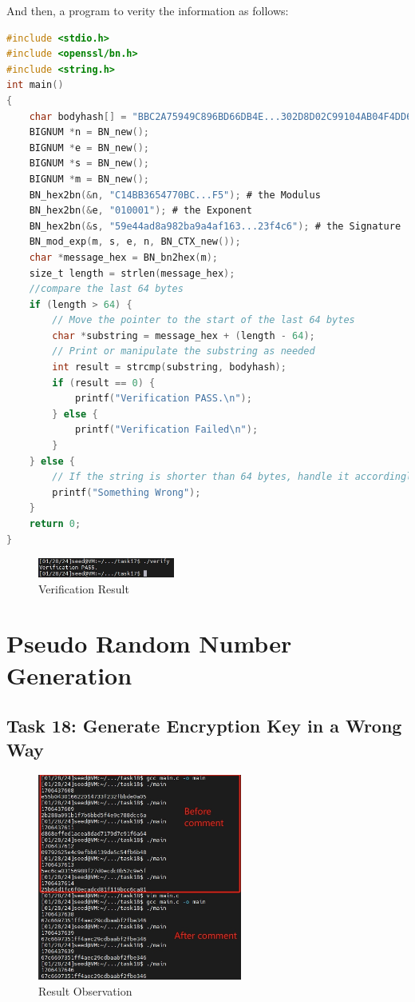\documentclass[a4paper]{article}
\begin{document}
And then, a program to verity the information as follows:
\begin{lstlisting}[caption={C Program Code for Manually Verifying},label={lst:task17},language=C,breaklines=true]
#include <stdio.h>
#include <openssl/bn.h>
#include <string.h>
int main()
{
    char bodyhash[] = "BBC2A75949C896BD66DB4E...302D8D02C99104AB04F4DD6"; # the Body HASH
    BIGNUM *n = BN_new();
    BIGNUM *e = BN_new();
    BIGNUM *s = BN_new();
    BIGNUM *m = BN_new();
    BN_hex2bn(&n, "C14BB3654770BC...F5"); # the Modulus
    BN_hex2bn(&e, "010001"); # the Exponent
    BN_hex2bn(&s, "59e44ad8a982ba9a4af163...23f4c6"); # the Signature
    BN_mod_exp(m, s, e, n, BN_CTX_new());
    char *message_hex = BN_bn2hex(m);
    size_t length = strlen(message_hex);
    //compare the last 64 bytes
    if (length > 64) {
        // Move the pointer to the start of the last 64 bytes
        char *substring = message_hex + (length - 64);
        // Print or manipulate the substring as needed
        int result = strcmp(substring, bodyhash);
        if (result == 0) {
            printf("Verification PASS.\n");
        } else {
            printf("Verification Failed\n");
        }
    } else {
        // If the string is shorter than 64 bytes, handle it accordingly
        printf("Something Wrong");
    }
    return 0;
}
\end{lstlisting} 
\begin{figure}[h]
    \centering
       \includegraphics[width=0.4\textwidth]{figures/task17/result.png}
    \caption{Verification Result}\label{fig:task17result}
\end{figure}
\section{Pseudo Random Number Generation}
\subsection{Task 18: Generate Encryption Key in a Wrong Way}
\begin{figure}[h]
    \centering
       \includegraphics[width=0.6\textwidth]{figures/task18/task18.png}
    \caption{Result Observation}\label{fig:task18result}
\end{figure}
\end{document}
